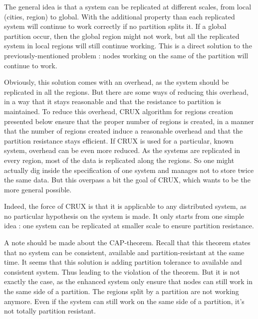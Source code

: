 \documentclass[a4paper,11pt,oneside]{report}
\begin{document}
The general idea is that a system can be replicated at different scales, from
local (cities, region) to global.  With the additional property than each replicated system
will continue to work correctly if no partition splits it. If a global
partition occur, then the global region might not work, but all the replicated
system in local regions will still continue working. This is a direct solution to the previously-mentioned problem
: nodes working on the same of the partition will continue to work.

Obviously, this solution comes with an overhead, as the system should be replicated in all
the regions. But there are some ways of reducing this overhead, in a way that
it stays reasonable and that the resistance to partition is maintained. To
reduce this overhead, CRUX algorithm for regions creation presented below
ensure that the proper number of regions is created, in a manner that the number of regions created induce a reasonable
overhead and that the partition resistance stays efficient. If
CRUX is used for a particular, known system, overhead can be even more reduced.
As the systems are replicated in every region, most of the data is replicated
along the regions. So one might actually dig inside the specification of one
system and manages not to store twice the same data. But this overpass a bit
the goal of CRUX, which wants to be the more general possible. 

Indeed, the force of CRUX is that it is applicable to any distributed
system, as no particular hypothesis on the system is made. It only starts from
one simple idea : one system can be replicated at smaller scale to ensure
partition resistance. 

A note should be made about the CAP-theorem. Recall that this theorem states
that no system can be consistent, available and partition-resistant at the same
time. It seems that this solution is adding partition tolerance to available
and consistent system. Thus leading to the violation of the theorem. But it is
not exactly the case, as the enhanced system only ensure that nodes can still
work in the same side of a partition. The regions split by a partition are
not working anymore. Even if the system can still work on the same side of a
partition, it's not totally partition resistant.

\end{document}
